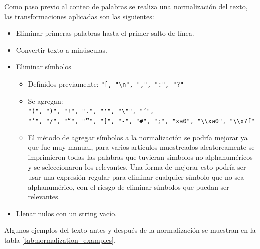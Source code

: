 \documentclass[11pt, a4paper]{article}
\begin{document}
Como paso previo al conteo de palabras se realiza una normalización del texto,
 las transformaciones aplicadas son las siguientes:\\
\begin{itemize}
    \item Eliminar primeras palabras hasta el primer salto de línea. \\
    \item Convertir texto a minúsculas.\\
    \item Eliminar símbolos\\
    \begin{itemize}
        \item Definidos previamente: \verb|"[, "\n", ",", ":", "?"|
        \item Se agregan: \\
            \verb|"(", ")", "!", ".", "'", "\"", "’",|\\
            \verb|"‘", "/", "“", "”", "]", "-", "#", ";", "xa0", "\\xa0", "\\x7f"|\\
        
        \item El método de agregar símbolos a la normalización se podría mejorar ya que fue muy manual, 
        para varios artículos muestreados aleatoreamente se imprimieron todas las palabras que 
        tuvieran símbolos no alphanuméricos y se seleccionaron los relevantes. 
        Una forma de mejorar esto podría ser usar una expresión regular para eliminar cualquier símbolo que no sea alphanumérico,
        con el riesgo de eliminar símbolos que puedan ser relevantes. 
    \end{itemize}
    \item Llenar nulos con un string vacío.
\end{itemize}


Algunos ejemplos del texto antes y después de la normalización se muestran en la tabla \ref{tab:normalization_examples}.
\end{document}
